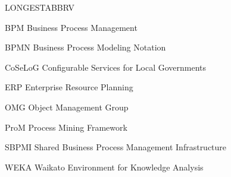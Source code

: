 \begin{theglossary}{LONGESTABBRV}
\item[BPM] Business Process Management
\item[BPMN] Business Process Modeling Notation
\item[CoSeLoG] Configurable Services for Local Governments
\item[ERP] Enterprise Resource Planning
\item[OMG] Object Management Group
\item[ProM] Process Mining Framework
\item[SBPMI] Shared Business Process Management Infrastructure
\item[WEKA] Waikato Environment for Knowledge Analysis
\end{theglossary}
